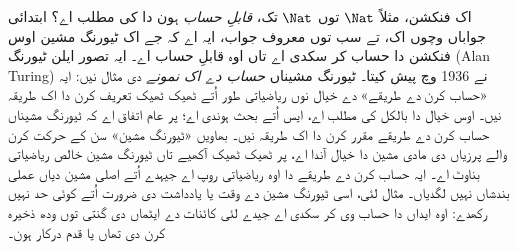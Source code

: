 \documentclass[../../../include/open-logic-section]{subfiles}
\begin{document}

اک فنکشن، مثلاً $\Nat$ توں $\Nat$ تک،
\emph{قابلِ حساب} ہون دا کی مطلب اے؟
ابتدائی جواباں وچوں اک، تے سب توں معروف
جواب، ایہ اے کہ جے اک ٹیورنگ مشین
اوس فنکشن دا حساب کر سکدی اے تاں
اوہ قابلِ حساب اے۔ ایہ تصور ایلن ٹیورنگ
(Alan Turing) نے 1936 وچ پیش کیتا۔
ٹیورنگ مشیناں \emph{حساب دے اک نمونے}
دی مثال نیں: ایہ «حساب کرن دے طریقے»
دے خیال نوں ریاضیاتی طور اُتے ٹھیک ٹھیک
تعریف کرن دا اک طریقہ نیں۔ اوس خیال
دا بالکل کی مطلب اے، ایس اُتے بحث
ہوندی اے؛ پر عام اتفاق اے کہ ٹیورنگ
مشیناں حساب کرن دے طریقے مقرر کرن
دا اک طریقہ نیں۔ بھاویں «ٹیورنگ مشین»
سن کے حرکت کرن والے پرزیاں دی مادی
مشین دا خیال آندا اے، پر ٹھیک ٹھیک آکھیے
تاں ٹیورنگ مشین خالص ریاضیاتی بناوٹ اے۔
ایہ حساب کرن دے طریقے دا اوہ ریاضیاتی روپ اے
جیہدے اُتے اصلی مشین دیاں عملی بندشاں نہیں لگدیاں۔ مثال لئی،
اسی ٹیورنگ مشین دے وقت یا یادداشت
دی ضرورت اُتے کوئی حد نہیں رکھدے:
اوہ ایداں دا حساب وی کر سکدی اے
جیدے لئی کائنات دے ایٹماں دی گنتی
توں ودھ ذخیرہ کرن دی تھاں یا قدم
درکار ہون۔
\end{document}
